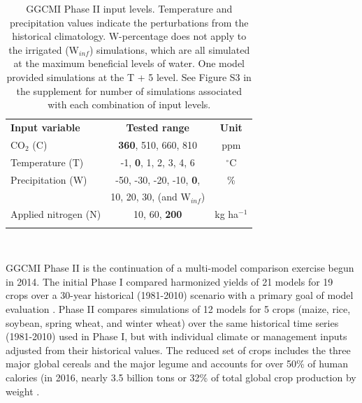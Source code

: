 \documentclass[gmd, manuscript]{copernicus} %
\begin{document}
\begin{table}[t]
\caption{GGCMI Phase II input levels. Temperature and precipitation values indicate the perturbations from the historical climatology. W-percentage does not apply to the irrigated (W$_{inf}$) simulations, which are all simulated at the maximum beneficial levels of water. One model provided simulations at the T + 5 level. See Figure S3 in the supplement for number of simulations associated with each combination of input levels.}
\label{table:inputs} 
    \begin{tabular}{lcc} 
        \tophline \vspace{1mm}
        \textbf{Input variable} & \textbf{Tested range} & \textbf{Unit} \\ \middlehline \vspace{1mm}
        CO$_2$ (C) & \textbf{360}, 510, 660, 810 & ppm\\ \middlehline \vspace{1mm}
        Temperature (T) & -1, \textbf{0}, 1, 2, 3, 4, 6 & $^{\circ}$C\\ \middlehline \vspace{1mm}
        Precipitation (W) & -50, -30, -20, -10, \textbf{0}, & \% \\
        {} & 10, 20, 30, (and W$_{inf}$) & {} \\ \middlehline \vspace{1mm}
        Applied nitrogen (N) & 10, 60, \textbf{200} & kg ha$^{-1}$ \\ \bottomhline
    \end{tabular}\\
\end{table}

GGCMI Phase II is the continuation of a multi-model comparison exercise begun in 2014. The initial Phase I compared harmonized yields of 21 models for 19 crops over a 30-year historical (1981-2010) scenario with a primary goal of model evaluation \citep{Elliott2015, muller_global_2017}. Phase II compares simulations of 12 models for 5 crops (maize, rice, soybean, spring wheat, and winter wheat) over the same historical time series (1981-2010) used in Phase I, but with individual climate or management inputs adjusted from their historical values. The reduced set of crops includes the three major global cereals and the major legume and accounts for over 50\% of human calories (in 2016, nearly 3.5 billion tons or 32\% of total global crop production by weight \citep{FAOSTAT}. 
\end{document}
